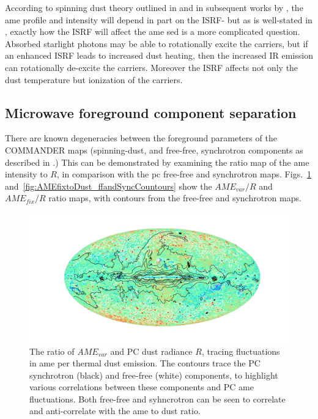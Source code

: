             According to spinning dust theory outlined in \cite{draine98a} and in subsequent works by \cite{ysard10a}, the \gls{ame} profile and intensity will depend in part on the ISRF- but as is well-stated in \cite{hensley17a}, exactly how the ISRF will affect the \gls{ame} \gls{sed} is a more complicated question. Absorbed starlight photons may be able to rotationally excite the carriers, but if an enhanced ISRF leads to increased dust heating, then the increased IR emission can rotationally de-excite the carriers. Moreover the ISRF affects not only the dust temperature but ionization of the carriers.

          \subsection{Microwave foreground component separation}
            There are known degeneracies between the foreground parameters of the COMMANDER maps (spinning-dust, and free-free, synchrotron components as described in \cite{planck15X}.) This can be demonstrated by examining the ratio map of the \gls{ame} intensity to $R$, in comparison with the \gls{pc} free-free and synchrotron maps. Figs.~\ref{fig:AMEvartoDust_ffandSyncCountours} and~\ref{fig:AMEfixtoDust_ffandSyncCountours} show the $AME_{var}/R$ and $AME_{fix}/R$ ratio maps, with contours from the free-free and synchrotron maps.
                \begin{figure}
                    \includegraphics[width=\textwidth,trim={6cm 2cm 5.0cm 2cm},clip]{../Plots/ch_allsky/AMEvartoDust_ffandSyncCountours.pdf}
                    \centering
                    \caption{The ratio of $AME_{var}$ and PC dust radiance $R$, tracing fluctuations in \gls{ame} per thermal dust emission. The contours trace the PC synchrotron (black) and free-free (white) components, to highlight various correlations between these components and PC \gls{ame} fluctuations. Both free-free and syhncrotron can be seen to correlate and anti-correlate with the \gls{ame} to dust ratio.}
                    \label{fig:AMEvartoDust_ffandSyncCountours}
                \end{figure}
